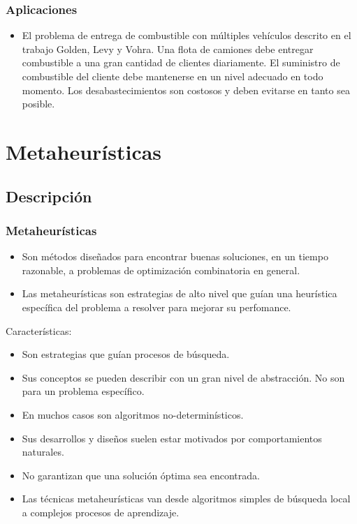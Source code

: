 \documentclass{beamer}
\begin{document}


\begin{frame}
\frametitle{Aplicaciones}

\begin{itemize}
	\item El problema de entrega de combustible con múltiples vehículos descrito en el trabajo Golden, Levy y Vohra. Una flota de camiones debe entregar combustible a una gran cantidad de clientes diariamente. El suministro de combustible del cliente debe mantenerse en un nivel adecuado en todo momento. Los desabastecimientos son costosos y deben evitarse en tanto sea posible.
\end{itemize}

\end{frame}


\section{Metaheurísticas}
\subsection{Descripción}

\begin{frame}
\frametitle{Metaheurísticas}

\begin{itemize}
    \item Son métodos diseñados para encontrar buenas soluciones, en un tiempo razonable, a problemas de optimización combinatoria en general.
    \pause
    \item Las metaheurísticas son estrategias de alto nivel que guían una heurística específica del problema a resolver para mejorar su perfomance.
    \pause
\end{itemize}

Caracter\'isticas:

\begin{itemize}
    \item Son estrategias que gu\'ian procesos de búsqueda.
    \item Sus conceptos se pueden describir con un gran nivel de abstracción. No son para un problema específico.
    \item En muchos casos son algoritmos no-determin\'isticos.
    \item Sus desarrollos y diseños suelen estar motivados por comportamientos naturales.
    \item No garantizan que una soluci\'on \'optima sea encontrada.
    \item Las t\'ecnicas metaheur\'isticas van desde algoritmos simples de b\'usqueda local a complejos procesos de aprendizaje.
\end{itemize}

\end{frame}
\end{document}
